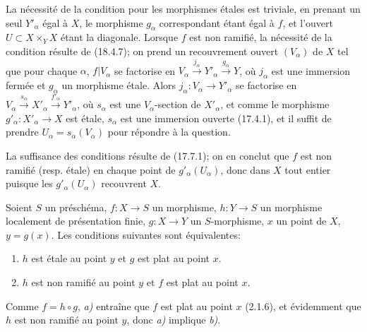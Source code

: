 La nécessité de la condition pour les morphismes étales est triviale, en prenant un seul $Y'_\alpha$ égal à $X$, le morphisme $g_\alpha$ correspondant étant égal à $f$, et l'ouvert $U\subset X\times_Y X$ étant la diagonale. Lorsque $f$ est non ramifié, la nécessité de la condition résulte de (18.4.7); on prend un recouvrement ouvert $(V_\alpha)$ de $X$ tel que pour chaque $\alpha$, $f|V_\alpha$ se factorise en $V_\alpha\xrightarrow{j_\alpha}Y'_\alpha\xrightarrow{g_\alpha}Y$, où $j_\alpha$ est une immersion fermée et $g_\alpha$ un morphisme étale. Alors $j_\alpha:V_\alpha\to Y'_\alpha$ se factorise en $V_\alpha\xrightarrow{s_\alpha}X'_\alpha\xrightarrow{f'_\alpha}Y'_\alpha$, où $s_\alpha$ est une $V_\alpha$-section de $X'_\alpha$, et comme le morphisme $g'_\alpha:X'_\alpha\to X$ est étale, $s_\alpha$ est une immersion ouverte (17.4.1), et il suffit de prendre $U_\alpha=s_\alpha(V_\alpha)$ pour répondre à la question.

La suffisance des conditions résulte de (17.7.1); on en conclut que $f$ est non ramifié (resp. étale) en chaque point de $g'_\alpha(U_\alpha)$, donc dans $X$ tout entier puisque les $g'_\alpha(U_\alpha)$ recouvrent $X$.

\begin{proposition}[18.4.9]
\label{IV.18.4.9}
Soient $S$ un préschéma, $f:X\to S$ un morphisme, $h:Y\to S$ un morphisme localement de présentation finie, $g:X\to Y$ un $S$-morphisme, $x$ un point de $X$, $y=g(x)$. Les conditions suivantes sont équivalentes:
\begin{enumerate}
  \item[\textup{a)}] $h$ est étale au point $y$ et $g$ est plat au point $x$.
  \item[\textup{b)}] $h$ est non ramifié au point $y$ et $f$ est plat au point $x$.
\end{enumerate}
\end{proposition}

Comme $f=h\circ g$, \emph{a)} entraîne que $f$ est plat au point $x$ (2.1.6), et évidemment que $h$ est non ramifié au point $y$, donc \emph{a)} implique \emph{b)}.

